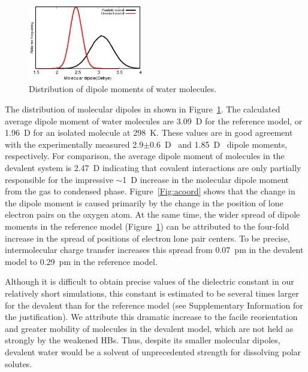 \documentclass[journal=jacsat,manuscript=article]{achemso}
\begin{document}
\begin{figure}
\includegraphics[width=0.45\textwidth]{new_dipole}
\caption{Distribution of dipole moments of water molecules.} \label{Fig:dipoledist}
\end{figure}

The distribution of molecular dipoles in shown in Figure~\ref{Fig:dipoledist}.  
The calculated average dipole moment of water molecules are 3.09~D for the reference model, or 1.96~D for an isolated molecule at 298~K.
These values are in good agreement with the experimentally measured 2.9$\pm$0.6~D~\cite{badyal2000electron} and 1.85~D~\cite{haynes2014crc} dipole moments, respectively. 
For comparison, the average dipole moment of molecules in the devalent system is 2.47~D indicating that covalent interactions are only partially responsible for the impressive $\sim$1~D increase in the molecular dipole moment from the gas to condensed phase. 
Figure~\ref{Fig:acoord} shows that the change in the dipole moment is caused primarily by the change in the position of lone electron pairs on the oxygen atom. 
At the same time, the wider spread of dipole moments in the reference model (Figure~\ref{Fig:dipoledist}) can be attributed to the four-fold increase in the spread of positions of electron lone pair centers. 
To be precise, intermolecular charge transfer increases this spread from 0.07~pm in the devalent model to 0.29~pm in the reference model.
%

Although it is difficult to obtain precise values of the dielectric constant in our relatively short simulations, this constant is estimated to be several times larger for the devalent than for the reference model (see Supplementary Information for the justification). 
We attribute this dramatic increase to the facile reorientation and greater mobility of molecules in the devalent model, which are not held as strongly by the weakened HBs. 
Thus, despite its smaller molecular dipoles, devalent water would be a solvent of unprecedented strength for dissolving polar solutes.
\end{document}
